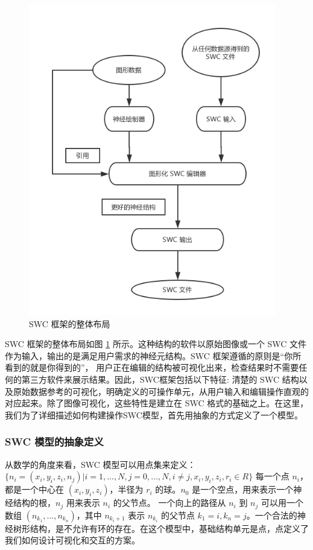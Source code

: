 {\begin{figure}
\centering
\includegraphics[width=108mm]{images/t1}
\caption{SWC 框架的整体布局}
\label{fan1}
\end{figure}

SWC 框架的整体布局如图 \ref{fan1} 所示。这种结构的软件以原始图像或一个 SWC 文件作为输入，输出的是满足用户需求的神经元结构。SWC 框架遵循的原则是“你所看到的就是你得到的”， 用户正在编辑的结构被可视化出来，检查结果时不需要任何的第三方软件来展示结果。因此，SWC框架包括以下特征: 清楚的 SWC 结构以及原始数据参考的可视化，明确定义的可操作单元，从用户输入和编辑操作直观的对应起来。除了图像可视化，这些特性是建立在 SWC 格式的基础之上。在这里，我们为了详细描述如何构建操作SWC模型，首先用抽象的方式定义了一个模型。

\subsubsection{SWC 模型的抽象定义}

从数学的角度来看，SWC 模型可以用点集来定义：$\{ n_i = (x_i, y_i, z_i, n_j) | i = 1,..., N, j = 0,..., N, i \neq j, x_i, y_i, z_i, r_i \in R \}$ 每一个点 $n_i$， 都是一个中心在 $(x_i, y_i, z_i)$，半径为 $r_i$ 的球。$n_0$ 是一个空点，用来表示一个神经结构的根，$n_j$ 用来表示 $n_i$ 的父节点。 一个向上的路径从 $n_i$ 到 $n_j$ 可以用一个数组 $(n_{k_1},...,n_{k_n})$，其中 $n_{k_i+1}$ 表示 $n_{k_i}$ 的父节点 $k_1 = i, k_n = j$。一个合法的神经树形结构，是不允许有环的存在。在这个模型中，基础结构单元是点，点定义了我们如何设计可视化和交互的方案。

}
